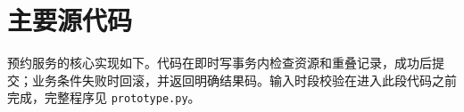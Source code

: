 \chapter{主要源代码}
预约服务的核心实现如下。代码在即时写事务内检查资源和重叠记录，成功后提交；业务条件失败时回滚，并返回明确结果码。输入时段校验在进入此段代码之前完成，完整程序见 \texttt{prototype.py}。

